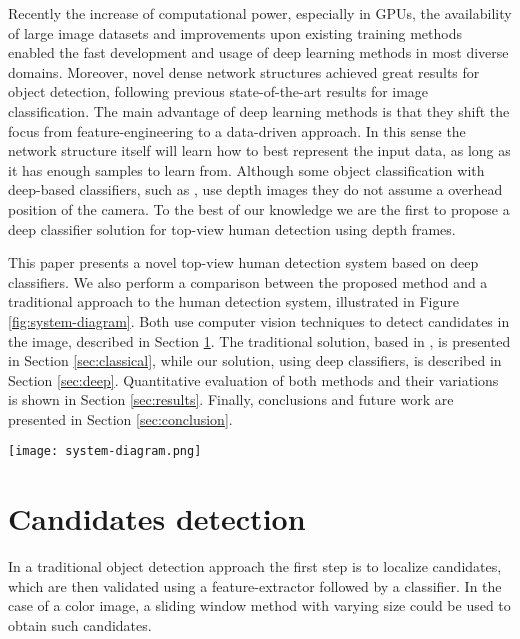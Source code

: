  Recently the increase of computational power, especially in GPUs, the availability of large image datasets and improvements upon existing training methods \cite{nair2010relu} enabled the fast development and usage of deep learning methods in most diverse domains. Moreover, novel dense network structures \cite{NIPS2013_5207} achieved great results for object detection, following previous state-of-the-art results \cite{hintonCONVNET} for image classification. The main advantage of deep learning methods is that they shift the focus from feature-engineering to a data-driven approach. In this sense the network structure itself will learn how to best represent the input data, as long as it has enough samples to learn from. Although some object classification with deep-based classifiers, such as \cite{thornberg2015combining}, use depth images they do not assume a overhead position of the camera. To the best of our knowledge we are the first to propose a deep classifier solution for top-view human detection using depth frames.

  This paper presents a novel top-view human detection system based on deep classifiers. We also perform a comparison between the proposed method and a traditional approach to the human detection system, illustrated in Figure \ref{fig:system-diagram}. Both use computer vision techniques to detect candidates in the image, described in Section \ref{sec:candidates}. The traditional solution, based in \cite{rauter}, is presented in Section \ref{sec:classical}, while our solution, using deep classifiers, is described in Section \ref{sec:deep}. Quantitative evaluation of both methods and their variations is shown in Section \ref{sec:results}. Finally, conclusions and future work are presented in Section \ref{sec:conclusion}.

  \begin{figure*}[!t]
  \centering
  \texttt{[image: system-diagram.png]}
  \caption{Human detection system diagram.}
  \label{fig:system-diagram}
  \end{figure*}

\section{Candidates detection}
\label{sec:candidates}

    In a traditional object detection approach \cite{traditional-objdetect} the first step is to localize candidates, which are then validated using a feature-extractor followed by a classifier. In the case of a color image, a sliding window method with varying size could be used to obtain such candidates.

